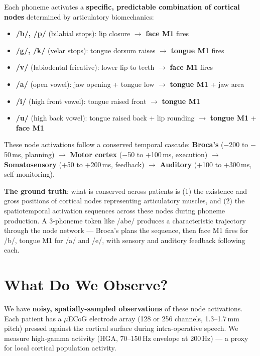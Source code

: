 \documentclass[11pt,letterpaper]{article}
\begin{document}
Each phoneme activates a \textbf{specific, predictable combination of cortical nodes} determined by articulatory biomechanics:

\begin{itemize}[leftmargin=2em]
\item \textbf{/b/, /p/} (bilabial stops): lip closure $\to$ \textbf{face M1} fires
\item \textbf{/g/, /k/} (velar stops): tongue dorsum raises $\to$ \textbf{tongue M1} fires
\item \textbf{/v/} (labiodental fricative): lower lip to teeth $\to$ \textbf{face M1} fires
\item \textbf{/a/} (open vowel): jaw opening + tongue low $\to$ \textbf{tongue M1} + jaw area
\item \textbf{/i/} (high front vowel): tongue raised front $\to$ \textbf{tongue M1}
\item \textbf{/u/} (high back vowel): tongue raised back + lip rounding $\to$ \textbf{tongue M1} + \textbf{face M1}
\end{itemize}

These node activations follow a conserved temporal cascade: \textbf{Broca's} ($-$200 to $-$50\,ms, planning) $\to$ \textbf{Motor cortex} ($-$50 to +100\,ms, execution) $\to$ \textbf{Somatosensory} (+50 to +200\,ms, feedback) $\to$ \textbf{Auditory} (+100 to +300\,ms, self-monitoring).

\textbf{The ground truth}: what is conserved across patients is (1) the existence and gross positions of cortical nodes representing articulatory muscles, and (2) the spatiotemporal activation sequences across these nodes during phoneme production. A 3-phoneme token like /abe/ produces a characteristic trajectory through the node network --- Broca's plans the sequence, then face M1 fires for /b/, tongue M1 for /a/ and /e/, with sensory and auditory feedback following each.


\section{What Do We Observe?}

We have \textbf{noisy, spatially-sampled observations} of these node activations. Each patient has a $\mu$ECoG electrode array (128 or 256 channels, 1.3--1.7\,mm pitch) pressed against the cortical surface during intra-operative speech. We measure high-gamma activity (HGA, 70--150\,Hz envelope at 200\,Hz) --- a proxy for local cortical population activity.
\end{document}
